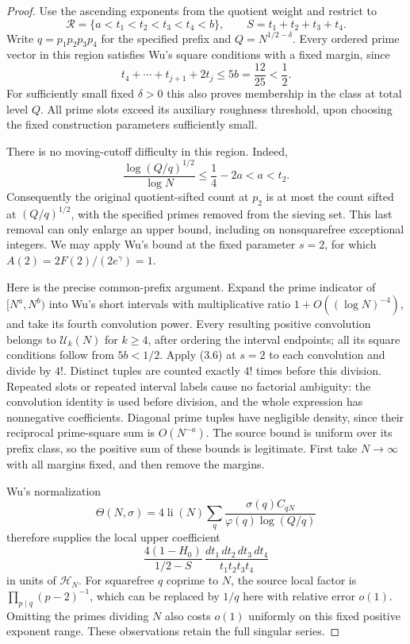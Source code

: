 \documentclass[11pt]{article}
\newcommand{\HN}{\mathcal H_N}
\begin{document}
\begin{proof}
Use the ascending exponents from the quotient weight and restrict to
\[
 \mathcal R=\{a<t_1<t_2<t_3<t_4<b\},\qquad
 S=t_1+t_2+t_3+t_4.
\]
Write $q=p_1p_2p_3p_4$ for the specified prefix and
$Q=N^{1/2-\delta}$.  Every ordered prime vector in this region satisfies
Wu's square conditions with a fixed margin, since
\[
 t_4+\cdots+t_{j+1}+2t_j\le5b=\frac{12}{25}<\frac12.
\]
For sufficiently small fixed $\delta>0$ this also proves membership
in the class at total level $Q$.  All prime slots exceed its auxiliary
roughness threshold, upon choosing the fixed construction parameters
sufficiently small.

There is no moving-cutoff difficulty in this region.  Indeed,
\[
 \frac{\log (Q/q)^{1/2}}{\log N}
 \le\frac14-2a<a<t_2.
\]
Consequently the original quotient-sifted count at $p_2$ is at most
the count sifted at $(Q/q)^{1/2}$, with the specified primes removed
from the sieving set.  This last removal can only enlarge an upper
bound, including on nonsquarefree exceptional integers.
We may apply Wu's bound at the fixed parameter $s=2$, for which
$A(2)=2F(2)/(2e^\gamma)=1$.

Here is the precise common-prefix argument.  Expand the prime
indicator of $[N^a,N^b)$ into Wu's short intervals with multiplicative
ratio $1+O((\log N)^{-4})$, and take its fourth convolution power.
Every resulting positive convolution belongs to $\mathcal U_k(N)$
for $k\ge4$, after ordering the interval endpoints; all its square
conditions follow from $5b<1/2$.  Apply (3.6) at $s=2$ to each
convolution and divide by $4!$.  Distinct tuples are counted exactly
$4!$ times before this division.  Repeated slots or repeated interval
labels cause no factorial ambiguity: the convolution identity is
used before division, and the whole expression has nonnegative
coefficients.  Diagonal prime tuples have negligible density, since
their reciprocal prime-square sum is $O(N^{-a})$.
The source bound is uniform over its prefix class, so the positive
sum of these bounds is legitimate.  First take $N\to\infty$ with
all margins fixed, and then remove the margins.

Wu's normalization
\[
 \Theta(N,\sigma)=4\operatorname{li}(N)
   \sum_q\frac{\sigma(q)C_{qN}}{\varphi(q)\log(Q/q)}
\]
therefore supplies the local upper coefficient
\begin{equation}\label{eq:safe-u10-old-kernel}
 \frac{4(1-H_0)}{1/2-S}\,
       \frac{dt_1\,dt_2\,dt_3\,dt_4}{t_1t_2t_3t_4}
\end{equation}
in units of $\HN$.  For squarefree $q$ coprime to $N$, the source
local factor is $\prod_{p\mid q}(p-2)^{-1}$, which can be replaced
by $1/q$ here with relative error $o(1)$.  Omitting the primes
dividing $N$ also costs $o(1)$ uniformly on this fixed positive
exponent range.  These observations retain the full singular series.


\end{proof}
\end{document}
